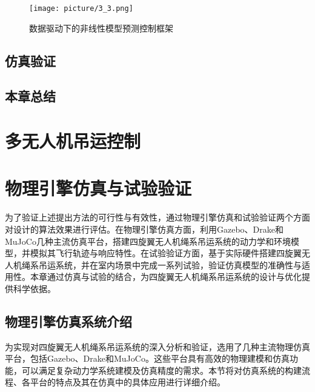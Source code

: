 \documentclass[lang=chs, degree=master, blindreview=false, winfonts=true]{yanputhesis}
\begin{document}
\begin{figure}[hbt!]
	\centering
	\texttt{[image: picture/3\_3.png]} 
	\caption{数据驱动下的非线性模型预测控制框架} \label{illustration_framework}
\end{figure}
\section{仿真验证}


\section{本章总结}




\cleardoublepage

\chapter{多无人机吊运控制}




\cleardoublepage

\chapter{物理引擎仿真与试验验证}
为了验证上述提出方法的可行性与有效性，通过物理引擎仿真和试验验证两个方面对设计的算法效果进行评估。在物理引擎仿真方面，利用Gazebo、Drake和MuJoCo几种主流仿真平台，搭建四旋翼无人机绳系吊运系统的动力学和环境模型，并模拟其飞行轨迹与响应特性。在试验验证方面，基于实际硬件搭建四旋翼无人机绳系吊运系统，并在室内场景中完成一系列试验，验证仿真模型的准确性与适用性。本章通过仿真与试验的结合，为四旋翼无人机绳系吊运系统的设计与优化提供科学依据。
\section{物理引擎仿真系统介绍}

为实现对四旋翼无人机绳系吊运系统的深入分析和验证，选用了几种主流物理仿真平台，包括Gazebo、Drake和MuJoCo。这些平台具有高效的物理建模和仿真功能，可以满足复杂动力学系统建模及仿真精度的需求。本节将对仿真系统的构建流程、各平台的特点及其在仿真中的具体应用进行详细介绍。
\end{document}

